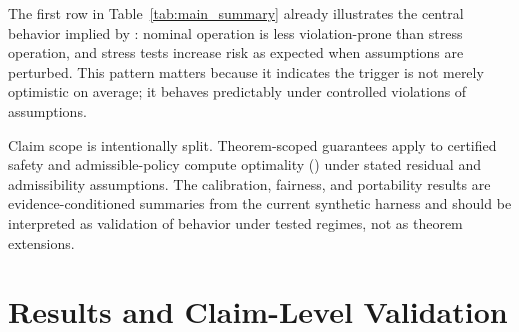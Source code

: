 \documentclass{article} %
\begin{document}
\begin{table}[t]
\caption{Primary quantitative outcomes used for claim-level validation. Values summarize the latest validation run with confidence-aware aggregation across baselines and seeds. Each row corresponds to a distinct claim family and is linked to a dedicated figure or appendix diagnostic.}
\label{tab:main_summary}
\centering
\small
\renewcommand{\arraystretch}{1.1}
\setlength{\tabcolsep}{4pt}
\end{table}

The first row in Table~\ref{tab:main_summary} already illustrates the central behavior implied by : nominal operation is less violation-prone than stress operation, and stress tests increase risk as expected when assumptions are perturbed. This pattern matters because it indicates the trigger is not merely optimistic on average; it behaves predictably under controlled violations of assumptions.

Claim scope is intentionally split. Theorem-scoped guarantees apply to certified safety and admissible-policy compute optimality () under stated residual and admissibility assumptions. The calibration, fairness, and portability results are evidence-conditioned summaries from the current synthetic harness and should be interpreted as validation of behavior under tested regimes, not as theorem extensions.

\section{Results and Claim-Level Validation}
\end{document}
